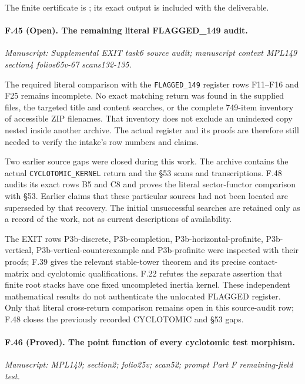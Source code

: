 The finite certificate is
; its exact output is
included with the deliverable.


\paragraph{F.45 (Open). The remaining literal FLAGGED\_149 audit.}
\textit{Manuscript: Supplemental EXIT task6 source audit; manuscript context MPL149 section4 folios65v-67 scans132-135.}

The required literal comparison with the \texttt{FLAGGED\_149}
register rows F11--F16 and F25 remains incomplete. No exact matching
return was found in the supplied files, the targeted title and content
searches, or the complete 749-item inventory of accessible ZIP
filenames. That inventory does not exclude an unindexed copy nested
inside another archive. The actual register and its proofs are
therefore still needed to verify the intake's row numbers and claims.

Two earlier source gaps were closed during this work. The
 archive contains
the actual \texttt{CYCLOTOMIC\_KERNEL} return and the \S53 scans and
transcriptions. F.48 audits its exact rows B5 and C8 and proves the
literal sector-functor comparison with \S53. Earlier claims that
these particular sources had not been located are superseded by
that recovery. The initial unsuccessful searches are retained only
as a record of the work, not as current descriptions of availability.

The EXIT rows P3b-discrete, P3b-completion,
P3b-horizontal-profinite, P3b-vertical,
P3b-vertical-counterexample and P3b-profinite were inspected with
their proofs; F.39 gives the relevant stable-tower theorem and its
precise contact-matrix and cyclotomic qualifications. F.22 refutes
the separate assertion that finite root stacks have one fixed
uncompleted inertia kernel. These independent mathematical results
do not authenticate the unlocated FLAGGED register. Only that
literal cross-return comparison remains open in this source-audit
row; F.48 closes the previously recorded CYCLOTOMIC and \S53 gaps.


\paragraph{F.46 (Proved). The point function of every cyclotomic test morphism.}
\textit{Manuscript: MPL149; section2; folio25v; scan52; prompt Part F remaining-field test.}

